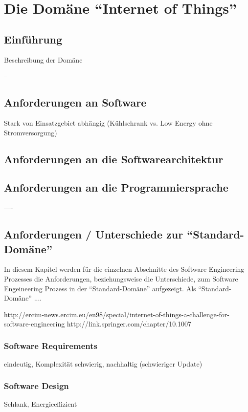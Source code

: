 \chapter{Die Domäne "`Internet of Things"'}

\section{Einführung}
Beschreibung der Domäne

--
\section{Anforderungen an Software}
Stark von Einsatzgebiet abhängig (Kühlschrank vs. Low Energy ohne Stromversorgung)


\section{Anforderungen an die Softwarearchitektur}

\section{Anforderungen an die Programmiersprache}

----

\section{Anforderungen / Unterschiede zur "`Standard-Domäne"'}
In diesem Kapitel werden für die einzelnen Abschnitte des Software Engineering Prozesses die Anforderungen, beziehungsweise die Unterschiede, zum Software Engeineering Prozess in der "`Standard-Domäne"' aufgezeigt. Als "`Standard-Domäne"' ....

http://ercim-news.ercim.eu/en98/special/internet-of-things-a-challenge-for-software-engineering
http://link.springer.com/chapter/10.1007%


\subsection{Software Requirements}
eindeutig, Komplexität schwierig, nachhaltig (schwieriger Update)

\subsection{Software Design}
Schlank, Energieeffizient

